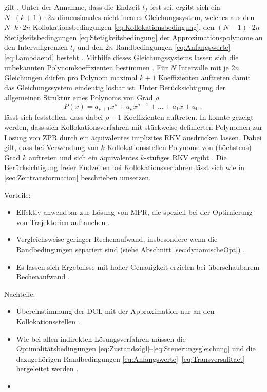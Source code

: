 gilt \cite{Papageorgiou.2012}. Unter der Annahme, dass die Endzeit $t_f$ fest sei, ergibt sich ein $N\cdot (k+1)\cdot 2n$-dimensionales nichtlineares Gleichungssystem, welches aus den $N\cdot k\cdot 2n$ Kollokationsbedingungen \eqref{eq:Kollokationsbedingung}, den $(N-1)\cdot 2n$ Stetigkeitsbedingungen \eqref{eq:Stetigkeitsbedingung} der Approximationspolynome an den Intervallgrenzen $t_i$ und den $2n$ Randbedingungen \eqref{eq:Anfangswerte}--\eqref{eq:Lambdaend} besteht \cite{Gerdts.2010}. Mithilfe dieses Gleichungssystems lassen sich die unbekannten Polynomkoeffizienten bestimmen \cite{Gerdts.2010}. Für $N$ Intervalle mit je $2n$ Gleichungen dürfen pro Polynom maximal $k+1$ Koeffizienten auftreten damit das Gleichungssystem eindeutig lösbar ist. Unter Berücksichtigung der allgemeinen Struktur eines Polynoms von Grad $\rho$
\begin{equation}
	P(x) = a_{\rho+1}x^\rho + a_{\rho}x^{\rho-1} + ... + a_{1}x + a_0\,,
\end{equation}
lässt sich feststellen, dass dabei $\rho+1$ Koeffizienten auftreten. In \cite{Ascher.1995c5} konnte gezeigt werden, dass sich Kollokationsverfahren mit stückweise definierten Polynomen zur Lösung von \gls{ZPR} durch ein äquivalentes implizites \gls{RKV} ausdrücken lassen. Dabei gilt, dass bei Verwendung von $k$ Kollokationsstellen Polynome von (höchstens) Grad $k$ auftreten und sich ein äquivalentes $k$-stufiges \gls{RKV} ergibt \cite{Ascher.1995c5}. Die Berücksichtigung freier Endzeiten bei Kollokationsverfahren lässt sich wie in \ref{sec:Zeittransformation} beschrieben umsetzen. 
\begin{multicols}{2}
	Vorteile:
	\begin{itemize}
		\item Effektiv anwendbar zur Lösung von \gls{MPR}, die speziell bei der Optimierung von Trajektorien auftauchen \cite{Betts.1998}.
		\item Vergleichsweise geringer Rechenaufwand, insbesondere wenn die Randbedingungen separiert sind (siehe Abschnitt \ref{sec:dynamischeOpt}) \cite{Cash.1980}.
		\item Es lassen sich Ergebnisse mit hoher Genauigkeit erzielen bei überschaubarem Rechenaufwand \cite{Cash.1980}.
	\end{itemize}
	
	\columnbreak
	
	Nachteile:
	\begin{itemize}
		\item Übereinstimmung der \gls{DGL} mit der Approximation nur an den Kollokationsstellen \cite{Betts.1998}.	
		\item Wie bei allen indirekten Lösungsverfahren müssen die Optimalitätsbedingungen \eqref{eq:Zustandsdgl}--\eqref{eq:Steuerungsgleichung} und die dazugehörigen Randbedingungen \eqref{eq:Anfangswerte}--\eqref{eq:Transversalitaet} hergeleitet werden \cite{Betts.1998}.

		\item[\vspace{\fill}]
	\end{itemize}
\end{multicols}
